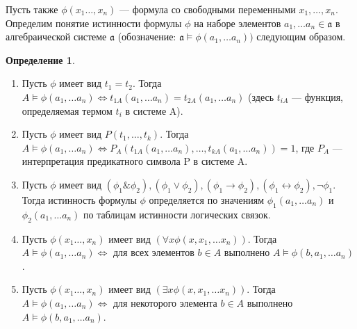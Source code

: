 \documentclass[a4paper]{article}
\theoremstyle{definition}
\newtheorem*{definition}{Определение}
\theoremstyle{remark}
\begin{document}
    Пусть также $\phi(x_1 \dots, x_n)$ — формула со свободными переменными $x_1, \dots, x_n$. Определим 
    понятие истинности формулы $\phi$ на наборе элементов $a_1, \dots a_n \in \mathfrak{a}$ в алгебраической 
    системе $\mathfrak{a}$ (обозначение: $\mathfrak{a} \models \phi(a_1, \dots a_n))$ следующим образом.
    \begin{definition}
        \begin{enumerate}
            \item Пусть $\phi$ имеет вид $t_1 = t_2$. Тогда $A \models \phi(a_1, \dots a_n) \Leftrightarrow t_{1A}(a_1, \dots a_n) = t_{2A}(a_1, \dots a_n)$ (здесь $t_{iA}$ —
            функция, определяемая термом $t_i$ в системе A).
            \item Пусть $\phi$ имеет вид $P(t_1,\dots, t_k)$. Тогда 
            $A \models \phi(a_1, \dots a_n) \Leftrightarrow P_A(t_{1A}(a_1, \dots a_n), \dots, t_{kA}(a_1, \dots a_n)) = 1$, 
            где $P_A$ — интерпретация предикатного символа P в системе A.
            \item Пусть $\phi$ имеет вид $(\phi_1 \& \phi_2), (\phi_1 \vee \phi_2), (\phi_1 \rightarrow \phi_2), (\phi_1 \leftrightarrow \phi_2), \neg\phi_1$. Тогда истинность формулы 
            $\phi$ определяется по значениям $\phi_1(a_1, \dots a_n)$ и $\phi_2(a_1, \dots a_n)$ по таблицам истинности логических 
            связок.
            \item Пусть $\phi(x_1 \dots, x_n)$ имеет вид $(\forall x \phi(x, x_1, \dots x_n))$. Тогда $A \models \phi(a_1, \dots a_n) \Leftrightarrow$ для всех элементов 
            $b \in A$ выполнено $A \models \phi (b, a_1, \dots a_n)$.
            \item Пусть $\phi(x_1 \dots, x_n)$ имеет вид $(\exists x \phi(x, x_1, \dots x_n))$. Тогда $A \models \phi(a_1, \dots a_n) \Leftrightarrow$ для некоторого 
            элемента $b \in A$ выполнено $A \models \phi (b, a_1, \dots a_n)$.
        \end{enumerate}
    \end{definition}
\end{document}

